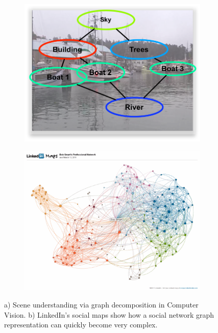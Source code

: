 \begin{figure}[ht]
    \begin{subfigure}{.45\linewidth}
        \centering
        \includegraphics[width=\linewidth]{Figures/scene}
        \caption{}
        \label{fig:scene}
    \end{subfigure}
    \begin{subfigure}{.45\linewidth}
        \centering
        \includegraphics[width=\linewidth]{Figures/linkedin-social-maps}
        \caption{}
        \label{fig:network}
    \end{subfigure}
\caption{a) Scene understanding via graph decomposition in Computer Vision. b)
        LinkedIn's social maps show how a social network graph representation
        can quickly become very complex.}
\end{figure}


